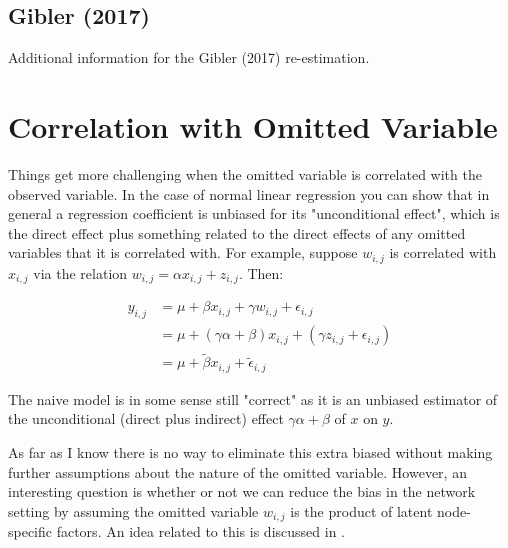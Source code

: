 \subsection*{Gibler (2017)}

Additional information for the Gibler (2017) re-estimation.


\FloatBarrier

\FloatBarrier
\clearpage

\section{Correlation with Omitted Variable}

Things get more challenging when the omitted variable is correlated with the observed variable. In the case of normal linear regression you can show that in general a regression coefficient is unbiased for its "unconditional effect", which is the direct effect plus something related to the direct effects of any omitted variables that it is correlated with. For example, suppose $w_{i,j}$ is correlated with $x_{i,j}$ via the relation $w_{i,j} = \alpha x_{i,j} + z_{i,j}$. Then:

\begin{align*}
y_{i,j} & = \mu + \beta x_{i,j} + \gamma w_{i,j} + \epsilon_{i,j} \\
&= \mu + (\gamma \alpha+\beta ) x_{i,j} + (\gamma z_{i,j} + \epsilon_{i,j})  \\
&= \mu + \tilde \beta x_{i,j} + \tilde \epsilon_{i,j}
\end{align*}

The naive model is in some sense still "correct" as it is an unbiased estimator of the unconditional (direct plus indirect) effect $\gamma\alpha + \beta$ of $x$ on $y$.

As far as I know there is no way to eliminate this extra biased without making further assumptions about the nature of the omitted variable. However, an interesting question is whether or not we can reduce the bias in the network setting by assuming the omitted variable $w_{i,j}$ is the product of latent node-specific factors. An idea related to this is discussed in \citet{minhas:etal:2017:arxiv}. 

